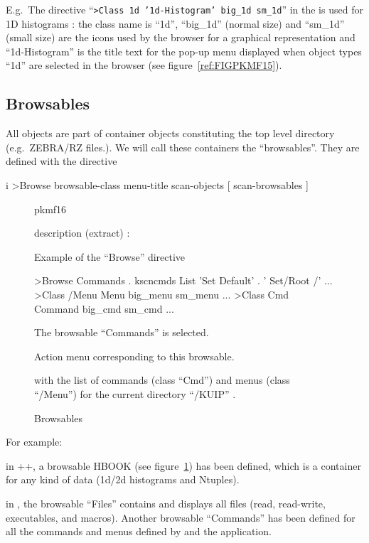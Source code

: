 E.g.\ The directive ``{\tt >Class 1d '1d-Histogram' big\_1d sm\_1d}'' in the 
\PAW{} \CDF{} is used for 1D histograms : the class name is ``1d'', ``big\_1d''
(normal size) and ``sm\_1d'' (small size) are the icons used by the browser 
for a graphical representation and ``1d-Histogram'' is the title text for
the pop-up menu displayed when object types ``1d'' are selected in the browser
(see figure~\ref{ref:FIGPKMF15}).

\subsection{Browsables}
\label{ref:rebrdef}

All objects are part of container objects constituting the top level directory
(e.g.\ ZEBRA/RZ files.). We will call these containers the ``browsables''.
They are defined with the \CDF{} directive
\begin{Gray}{i}
>Browse  browsable-class  menu-title  scan-objects  [ scan-browsables ]
\end{Gray}

\begin{figure}[tb]
\begin{PICTf}[.5]{pkmf16}
\begin{DLsf}{}
\item[\quad \CDF{} description (extract) :]
\item
\item
\begin{XMPt}{Example of the ``Browse'' directive}\footnotesize

>Browse Commands . kscncmds%
 List
'Set Default'  .  ' Set/Root /'
...
>Class /Menu Menu big_menu sm_menu
...
>Class Cmd Command big_cmd sm_cmd
...
\end{XMPt}
\end{DLsf}
\end{PICTf}
\begin{EnumZB}
\item The browsable ``Commands'' is selected.
\item Action menu corresponding to this browsable.
\item \OW{} with the list of commands (class ``Cmd'') and menus 
(class ``/Menu'') for the current directory ``/KUIP'' .
\vspace{-1\baselineskip}
\end{EnumZB}
\caption{Browsables}
\label{ref:FIGPKMF16}
\end{figure}

For example:
\begin{UL}
\item
in \PAW++{}, a browsable HBOOK (see figure~\ref{ref:FIGPKMF16}) has been
defined, which is a container for any  
kind of \HBOOK{} data (1d/2d histograms and Ntuples).
\item
in \KUIPMotif{}, the browsable ``Files'' contains and displays all files
(read, read-write, executables, and \KUIP{} macros). Another browsable 
``Commands'' has been defined for all the commands and menus defined 
by \KUIP{} and the application.
\end{UL}

